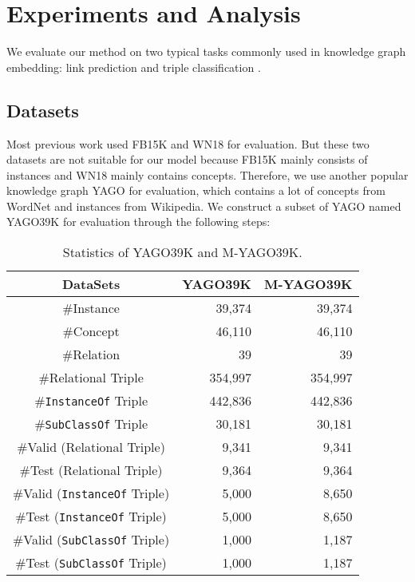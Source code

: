 \documentclass[11pt,a4paper]{article}
\begin{document}
  \section{Experiments and Analysis}
  
  We evaluate our method on two typical tasks commonly used in knowledge graph embedding: link prediction \cite{TransE} and triple classification
  \cite{NTN}. 
  
  \subsection{Datasets}
  
  Most previous work used FB15K and WN18 \cite{TransE} for evaluation.
  But these two datasets are not suitable for our model because FB15K mainly consists of instances and WN18 mainly contains concepts.
  Therefore, we use another popular knowledge graph YAGO \cite{YAGO} for evaluation, which contains a lot of concepts from WordNet and instances from Wikipedia. 
  We construct a subset of YAGO named YAGO39K for evaluation through the following steps:
  
  \begin{table}
    \small
    \centering
    \setlength\tabcolsep{2pt}
  \begin{tabular}{|c|r|r|}
    \hline
    {DataSets} & {YAGO39K} & {M-YAGO39K}\\\hline
    \#Instance & {39,374} & {39,374}\\ 
    \#Concept & {46,110} & {46,110}\\ 
    \#Relation & {39} & {39}\\ 
    \#Relational Triple & {354,997} & {354,997}\\ 
    \#\texttt{InstanceOf} Triple & {442,836} & {442,836}\\ 
    \#\texttt{SubClassOf} Triple & {30,181} & {30,181}\\\hline
    \#Valid (Relational Triple) & {9,341} & {9,341}\\ 
    \#Test (Relational Triple) & {9,364} & {9,364}\\ 
    \#Valid (\texttt{InstanceOf} Triple) & {5,000} & {8,650}\\ 
    \#Test (\texttt{InstanceOf} Triple) & {5,000} & {8,650}\\ 
    \#Valid (\texttt{SubClassOf} Triple) & {1,000} & {1,187}\\
    \#Test (\texttt{SubClassOf} Triple) & {1,000} & {1,187}\\
    \hline 
    \end{tabular}
    \caption{\label{table1}Statistics of YAGO39K and M-YAGO39K.}
    \end{table}
    
\end{document}
